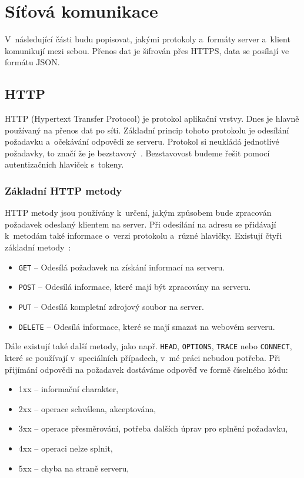 \section{Síťová komunikace}
V~následující části budu popisovat, jakými protokoly a~formáty server a~klient komunikují mezi sebou. Přenos dat je šifrován přes HTTPS, data se posílají ve formátu JSON.
\subsection{HTTP}
HTTP (Hypertext Transfer Protocol) je protokol aplikační vrstvy. Dnes je hlavně používaný na přenos dat po síti. Základní princip tohoto protokolu je odesílání požadavku a~očekávání odpovědi ze serveru. Protokol si neukládá jednotlivé požadavky, to značí že je bezstavový~\cite{a2021_ibm}. Bezstavovost budeme řešit pomocí autentizačních hlaviček s~tokeny. 
\subsubsection{Základní HTTP metody}
HTTP metody jsou používány k~určení, jakým způsobem bude zpracován požadavek odeslaný klientem na server. Při odesílání na adresu se přidávají k~metodám také informace o~verzi protokolu a~různé hlavičky. Existují čtyři základní metody~\cite{gourley2002http}:
\begin{itemize}
\item \texttt{GET} -- Odesílá požadavek na získání informací na serveru.
\item \texttt{POST} -- Odesílá informace, které mají být zpracovány na serveru.
\item \texttt{PUT} -- Odesílá kompletní zdrojový soubor na server.
\item \texttt{DELETE} -- Odesílá informace, které se mají smazat na webovém serveru.
\end{itemize}
Dále existují také další metody, jako např. \texttt{HEAD}, \texttt{OPTIONS}, \texttt{TRACE} nebo \texttt{CONNECT}, které se používají v~speciálních případech, v~mé práci nebudou potřeba.
Při přijímání odpovědi na požadavek dostáváme odpověď ve formě číselného kódu:
\begin{itemize}
    \item 1xx -- informační charakter,
    \item 2xx -- operace schválena, akceptována,
    \item 3xx -- operace přesměrování, potřeba dalších úprav pro splnění požadavku,
    \item 4xx -- operaci nelze splnit,
    \item 5xx -- chyba na straně serveru,
\end{itemize}

